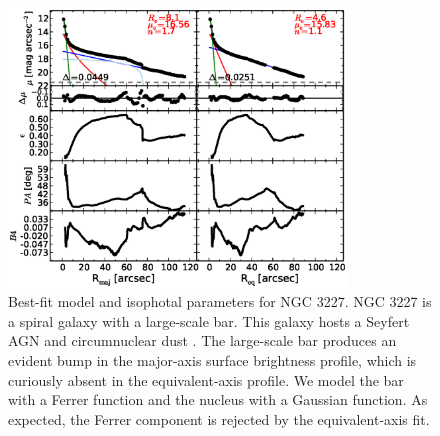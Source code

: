 \documentclass[preprint2]{emulateapj}
\newcommand{\fitfigurewidth}{0.8\textwidth}
\begin{document}
  \begin{figure}[h]
  \begin{center}
  \includegraphics[width=\fitfigurewidth]{images/n3227_1Dfit.eps}
  \caption{Best-fit model and isophotal parameters for NGC 3227.
  NGC 3227 is a spiral galaxy with a large-scale bar. 
  This galaxy hosts a Seyfert AGN \citep{khachikian1974} and circumnuclear dust \citep{martini2003}. 
  The large-scale bar produces an evident bump in the major-axis surface brightness profile,
  which is curiously absent in the equivalent-axis profile. 
  We model the bar with a Ferrer function and the nucleus with a Gaussian function. 
  As expected, the Ferrer component is rejected by the equivalent-axis fit. 
  }
  \end{center}
  \end{figure}
\end{document}
